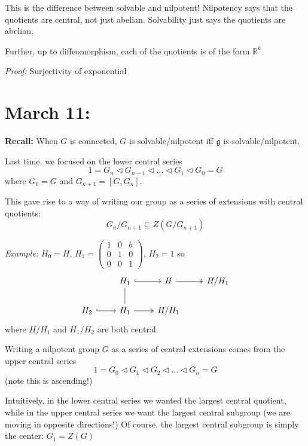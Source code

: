 \documentclass[12pt]{article}
\newcommand{\R}{\mathbb{R}}
\newcommand{\g}{\mathfrak{g}}
\newenvironment*{tbox}[2][gray]{
    \begin{tcolorbox}[
        parbox=false,
        colback=#1!5!white,
        colframe=#1!75!black,
        breakable,
        title={#2}
    ]}
    {\end{tcolorbox}}
\begin{document}
    This is the difference between solvable and nilpotent! Nilpotency says that the quotients are central, not just abelian. Solvability just says the quotients are abelian.
    
    Further, up to diffeomorphism, each of the quotients is of the form $\R^k$ 

    \begin{tbox}{\textbf{Theorem:} Let $G$ be a connected lie group. Then $G$ is nilpotent as a group iff $\g$ is a nilpotent lie algebra. Further, $\g$ is solvable iff $G$ is solvable.}
        \emph{Proof:} Surjectivity of exponential
    \end{tbox}

\section{March 11:} 
    \textbf{Recall:} When $G$ is connected, $G$ is solvable/nilpotent iff $\g$ is solvable/nilpotent. 

    Last time, we focused on the lower central series 
    \[1 = G_n \triangleleft G_{n-1} \triangleleft \dots \triangleleft G_1 \triangleleft G_0 = G\]
    where $G_0 = G$ and $G_{n+1} = [G, G_n]$.

    This gave rise to a way of writing our group as a series of extensions with central quotients: 
    \[G_n/G_{n+1} \subseteq Z(G/G_{n+1})\]

    \emph{Example:} $H_0 = H$, $H_1 = \begin{pmatrix}
        1 & 0 & b\\ 
        0 & 1 & 0\\ 
        0 & 0 & 1
    \end{pmatrix}$, $H_2 = 1$ so 
    \[\begin{tikzcd}
        & H_1 \arrow[hook]{r} & H \arrow[two heads]{r} & H/H_1\\ 
        H_2 \arrow[hook]{r} & H_1 \arrow[no head]{u} \arrow[two heads]{r} & H/H_1
    \end{tikzcd}\]
    where $H/H_1$ and $H_1/H_2$ are both central. 

    Writing a nilpotent group $G$ as a series of central extensions comes from the upper central series 
    \[1 = G_0 \triangleleft G_1 \triangleleft G_2 \triangleleft \dots \triangleleft G_n = G\]
    (note this is ascending!)

    Intuitively, in the lower central series we wanted the largest central quotient, while in the upper central series we want the largest central subgroup (we are moving in opposite directions!) Of course, the largest central subgroup is simply the center: $G_1 = Z(G)$ 
\end{document}
